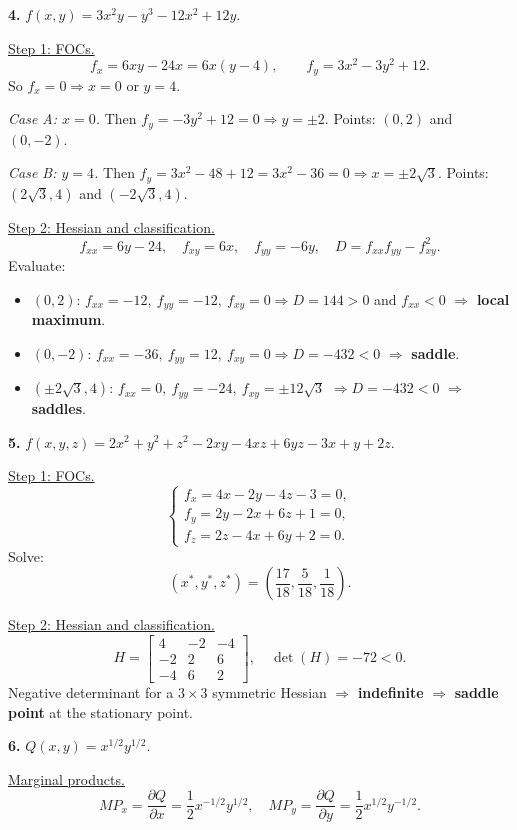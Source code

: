 \documentclass[12pt]{article}
\begin{document}
\medskip

\textbf{4.} $f(x,y)=3x^2y-y^3-12x^2+12y$.

\underline{Step 1: FOCs.}
\[
f_x=6xy-24x=6x(y-4),\qquad f_y=3x^2-3y^2+12.
\]
So $f_x=0 \Rightarrow x=0$ or $y=4$.

\textit{Case A: $x=0$.} Then $f_y= -3y^2+12=0 \Rightarrow y=\pm 2$.
Points: $(0,2)$ and $(0,-2)$.

\textit{Case B: $y=4$.} Then $f_y=3x^2-48+12=3x^2-36=0\Rightarrow x=\pm 2\sqrt{3}$.
Points: $(2\sqrt{3},4)$ and $(-2\sqrt{3},4)$.

\underline{Step 2: Hessian and classification.}
\[
f_{xx}=6y-24,\quad f_{xy}=6x,\quad f_{yy}=-6y,\quad 
D=f_{xx}f_{yy}-f_{xy}^2.
\]
Evaluate:

\begin{itemize}
\item $(0,2)$: $f_{xx}=-12,\ f_{yy}=-12,\ f_{xy}=0 \Rightarrow D=144>0$ and $f_{xx}<0$ $\Rightarrow$ \textbf{local maximum}.
\item $(0,-2)$: $f_{xx}=-36,\ f_{yy}=12,\ f_{xy}=0 \Rightarrow D=-432<0$ $\Rightarrow$ \textbf{saddle}.
\item $(\pm 2\sqrt{3},4)$: $f_{xx}=0,\ f_{yy}=-24,\ f_{xy}=\pm 12\sqrt{3}$ $\Rightarrow D=-432<0$ $\Rightarrow$ \textbf{saddles}.
\end{itemize}

\medskip

\textbf{5.} $f(x,y,z)=2x^2+y^2+z^2-2xy-4xz+6yz-3x+y+2z$.

\underline{Step 1: FOCs.}
\[
\begin{cases}
f_x=4x-2y-4z-3=0,\\
f_y=2y-2x+6z+1=0,\\
f_z=2z-4x+6y+2=0.
\end{cases}
\]
Solve:
\[
(x^\ast,y^\ast,z^\ast)=\left(\frac{17}{18},\frac{5}{18},\frac{1}{18}\right).
\]

\underline{Step 2: Hessian and classification.}
\[
H=\begin{bmatrix}
4&-2&-4\\
-2&2&6\\
-4&6&2
\end{bmatrix},\quad \det(H)=-72<0.
\]
Negative determinant for a $3\times 3$ symmetric Hessian $\Rightarrow$ \textbf{indefinite} $\Rightarrow$ \textbf{saddle point} at the stationary point.

\medskip

\textbf{6.} $Q(x,y)=x^{1/2}y^{1/2}$.

\underline{Marginal products.}
\[
MP_x=\frac{\partial Q}{\partial x}=\frac{1}{2}x^{-1/2}y^{1/2},\quad 
MP_y=\frac{\partial Q}{\partial y}=\frac{1}{2}x^{1/2}y^{-1/2}.
\]
\end{document}
